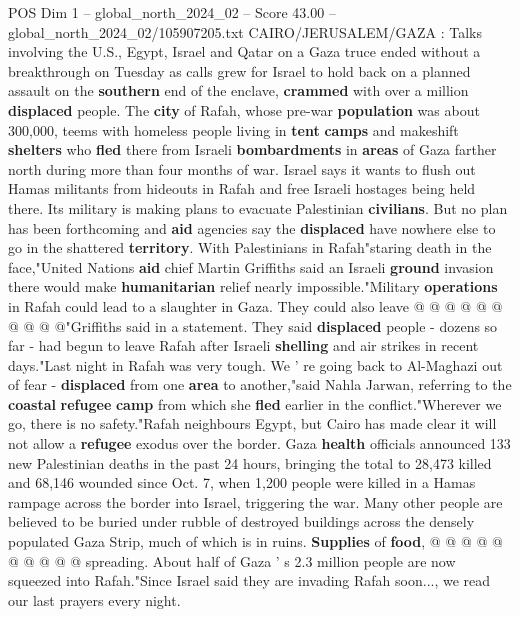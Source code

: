 \begin{textsample}{POS Dim 1 – global\_north\_2024\_02 – Score 43.00 – global\_north\_2024\_02/105907205.txt}  \label{ex:f1_pos_097}
CAIRO/JERUSALEM/GAZA : Talks involving the U.S., Egypt, Israel and Qatar on a Gaza truce ended without a breakthrough on Tuesday as calls grew for Israel to hold back on a planned assault on the \textbf{southern} end of the enclave, \textbf{crammed} with over a million \textbf{displaced} people.
The \textbf{city} of Rafah, whose pre-war \textbf{population} was about 300,000, teems with homeless people living in \textbf{tent} \textbf{camps} and makeshift \textbf{shelters} who \textbf{fled} there from Israeli \textbf{bombardments} in \textbf{areas} of Gaza farther north during more than four months of war.
Israel says it wants to flush out Hamas militants from hideouts in Rafah and free Israeli hostages being held there.
Its military is making plans to evacuate Palestinian \textbf{civilians}.
But no plan has been forthcoming and \textbf{aid} agencies say the \textbf{displaced} have nowhere else to go in the shattered \textbf{territory}.
With Palestinians in Rafah"staring death in the face,"United Nations \textbf{aid} chief Martin Griffiths said an Israeli \textbf{ground} invasion there would make \textbf{humanitarian} relief nearly impossible."Military \textbf{operations} in Rafah could lead to a slaughter in Gaza.
They could also leave @ @ @ @ @ @ @ @ @ @"Griffiths said in a statement.
They said \textbf{displaced} people - dozens so far - had begun to leave Rafah after Israeli \textbf{shelling} and air strikes in recent days."Last night in Rafah was very tough.
We ' re going back to Al-Maghazi out of fear - \textbf{displaced} from one \textbf{area} to another,"said Nahla Jarwan, referring to the \textbf{coastal} \textbf{refugee} \textbf{camp} from which she \textbf{fled} earlier in the conflict."Wherever we go, there is no safety."Rafah neighbours Egypt, but Cairo has made clear it will not allow a \textbf{refugee} exodus over the border.
Gaza \textbf{health} officials announced 133 new Palestinian deaths in the past 24 hours, bringing the total to 28,473 killed and 68,146 wounded since Oct. 7, when 1,200 people were killed in a Hamas rampage across the border into Israel, triggering the war.
Many other people are believed to be buried under rubble of destroyed buildings across the densely populated Gaza Strip, much of which is in ruins. \textbf{Supplies} of \textbf{food}, @ @ @ @ @ @ @ @ @ @ spreading.
About half of Gaza ' s 2.3 million people are now squeezed into Rafah."Since Israel said they are invading Rafah soon..., we read our last prayers every night.

\end{textsample}
